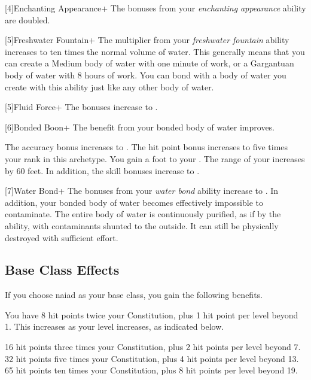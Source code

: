     [4]{Enchanting Appearance+} The bonuses from your \textit{enchanting appearance} ability are doubled.

    [5]{Freshwater Fountain+} The multiplier from your \textit{freshwater fountain} ability increases to ten times the normal volume of water.
    This generally means that you can create a Medium body of water with one minute of work, or a Gargantuan body of water with 8 hours of work.
    You can bond with a body of water you create with this ability just like any other body of water.

    [5]{Fluid Force+} The bonuses increase to .

    [6]{Bonded Boon+} The benefit from your bonded body of water improves.
    \begin{raggeditemize}
       The accuracy bonus increases to .
       The hit point bonus increases to five times your rank in this archetype.
       You gain a  foot  to your .
       The range of your  increases by 60 feet.
        In addition, the skill bonuses increase to .
    \end{raggeditemize}

    [7]{Water Bond+} The bonuses from your \textit{water bond} ability increase to .
    In addition, your bonded body of water becomes effectively impossible to contaminate.
    The entire body of water is continuously purified, as if by the  ability, with contaminants shunted to the outside.
    It can still be physically destroyed with sufficient effort.

  \subsection{Base Class Effects}
    \mediumhpprogressiontable

    If you choose naiad as your base class, you gain the following benefits.

      You have 8 hit points \add twice your Constitution, plus 1 hit point per level beyond 1.
      This increases as your level increases, as indicated below.
      \begin{raggeditemize}
         16 hit points \add three times your Constitution, plus 2 hit points per level beyond 7.
         32 hit points \add five times your Constitution, plus 4 hit points per level beyond 13.
         65 hit points \add ten times your Constitution, plus 8 hit points per level beyond 19.
      \end{raggeditemize}

